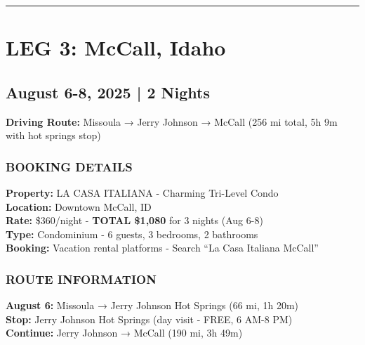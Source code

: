 \documentclass[
  11pt,
]{article}
\begin{document}
\begin{center}\rule{0.5\linewidth}{0.5pt}\end{center}

\newpage

\section{\texorpdfstring{\textcolor{primary}{LEG 3: McCall, Idaho}}{}}\label{section-17}

\subsection{\texorpdfstring{\textcolor{secondary}{August 6-8, 2025 | 2 Nights}}{}}\label{section-18}

\textbf{\textcolor{secondary}{Driving Route:}} Missoula → Jerry Johnson
→ McCall (256 mi total, 5h 9m with hot springs stop)

\subsubsection{\texorpdfstring{\textcolor{primary}{BOOKING DETAILS}}{}}\label{section-19}

\textbf{\textcolor{secondary}{Property:}} LA CASA ITALIANA - Charming
Tri-Level Condo\\
\textbf{\textcolor{secondary}{Location:}} Downtown McCall, ID\\
\textbf{\textcolor{secondary}{Rate:}} \$360/night -
\textbf{\textcolor{primary}{TOTAL \$1,080}} for 3 nights (Aug 6-8)\\
\textbf{\textcolor{secondary}{Type:}} Condominium - 6 guests, 3
bedrooms, 2 bathrooms\\
\textbf{\textcolor{secondary}{Booking:}} Vacation rental platforms -
Search ``La Casa Italiana McCall''

\subsubsection{\texorpdfstring{\textcolor{primary}{ROUTE INFORMATION}}{}}\label{section-20}

\textbf{\textcolor{secondary}{August 6:}} Missoula → Jerry Johnson Hot
Springs (66 mi, 1h 20m)\\
\textbf{\textcolor{secondary}{Stop:}} Jerry Johnson Hot Springs (day
visit - FREE, 6 AM-8 PM)\\
\textbf{\textcolor{secondary}{Continue:}} Jerry Johnson → McCall (190
mi, 3h 49m)
\end{document}
